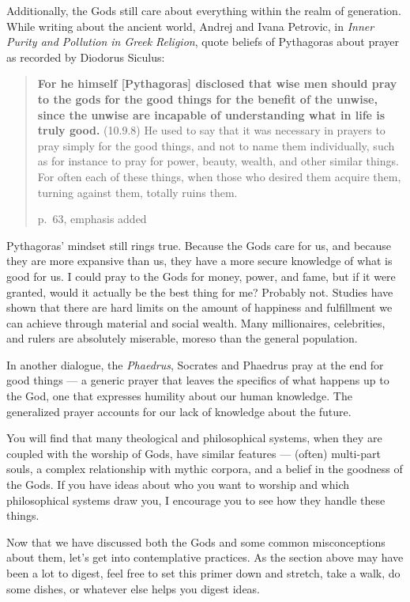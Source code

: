 \documentclass[
]{book}
\begin{document}
Additionally, the Gods still care about everything within the realm of generation. While writing about the ancient world, Andrej and Ivana Petrovic, in \emph{Inner Purity and Pollution in Greek Religion}, quote beliefs of Pythagoras about prayer as recorded by Diodorus Siculus:

\begin{quote}
\textbf{For he himself {[}Pythagoras{]} disclosed that wise men should pray to the gods for the good things for the benefit of the unwise, since the unwise are incapable of understanding what in life is truly good.} (10.9.8) He used to say that it was necessary in prayers to pray simply for the good things, and not to name them individually, such as for instance to pray for power, beauty, wealth, and other similar things. For often each of these things, when those who desired them acquire them, turning against them, totally ruins them.

p.~63, emphasis added
\end{quote}

Pythagoras' mindset still rings true. Because the Gods care for us, and because they are more expansive than us, they have a more secure knowledge of what is good for us. I could pray to the Gods for money, power, and fame, but if it were granted, would it actually be the best thing for me? Probably not. Studies have shown that there are hard limits on the amount of happiness and fulfillment we can achieve through material and social wealth. Many millionaires, celebrities, and rulers are absolutely miserable, moreso than the general population.

In another dialogue, the \emph{Phaedrus}, Socrates and Phaedrus pray at the end for good things --- a generic prayer that leaves the specifics of what happens up to the God, one that expresses humility about our human knowledge. The generalized prayer accounts for our lack of knowledge about the future.

You will find that many theological and philosophical systems, when they are coupled with the worship of Gods, have similar features --- (often) multi-part souls, a complex relationship with mythic corpora, and a belief in the goodness of the Gods. If you have ideas about who you want to worship and which philosophical systems draw you, I encourage you to see how they handle these things.

Now that we have discussed both the Gods and some common misconceptions about them, let's get into contemplative practices. As the section above may have been a lot to digest, feel free to set this primer down and stretch, take a walk, do some dishes, or whatever else helps you digest ideas.
\end{document}
